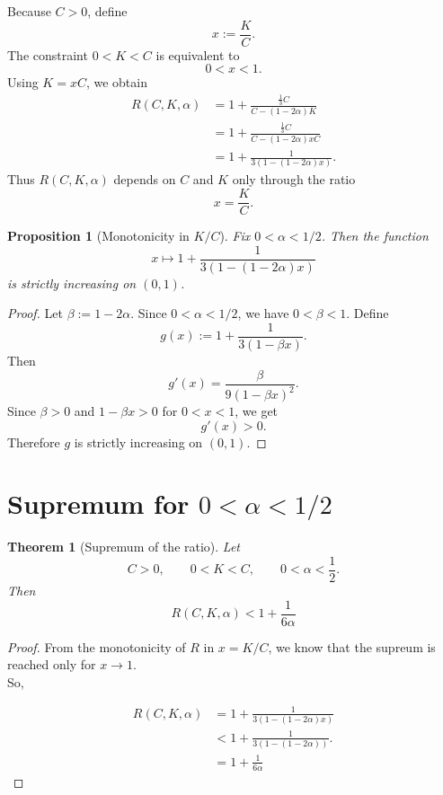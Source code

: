 \documentclass[11pt]{article}
\newtheorem{theorem}{Theorem}
\newtheorem{proposition}{Proposition}
\begin{document}
Because $C>0$, define
\[
    x:=\frac{K}{C}.
\]
The constraint $0<K<C$ is equivalent to
\[
    0<x<1.
\]
Using $K=xC$, we obtain
\begin{align*}
    R(C,K,\alpha)
    &=
    1+
    \frac{\frac13 C}{C-(1-2\alpha) K} \\
    &=
    1+
    \frac{\frac13 C}{C-(1-2\alpha)xC} \\
    &=
    1+
    \frac{1}{3(1-(1-2\alpha) x)}.
\end{align*}
Thus $R(C,K,\alpha)$ depends on $C$ and $K$ only through the ratio
\[
    x=\frac KC.
\]

\begin{proposition}[Monotonicity in $K/C$]
Fix $0<\alpha<1/2$. Then the function
\[
    x\mapsto 1+\frac{1}{3(1-(1-2\alpha)x)}
\]
is strictly increasing on $(0,1)$.
\end{proposition}

\begin{proof}
Let $\beta := 1-2\alpha$. Since $0<\alpha<1/2$, we have $0<\beta<1$. Define
\[
    g(x):=1+\frac{1}{3(1-\beta x)}.
\]
Then
\[
    g'(x)
    =
    \frac{\beta}{9(1-\beta x)^2}.
\]
Since $\beta>0$ and $1-\beta x>0$ for $0<x<1$, we get
\[
    g'(x)>0.
\]
Therefore $g$ is strictly increasing on $(0,1)$.
\end{proof}

\section{Supremum for $0<\alpha<1/2$}

\begin{theorem}[Supremum of the ratio]
Let
\[
    C>0, \qquad 0<K<C, \qquad 0<\alpha<\frac12.
\]
Then
\[
    R(C,K,\alpha)<1+\frac{1}{6\alpha}
\]
\end{theorem}

\begin{proof}
From the monotonicity of $R$ in $x=K/C$, we know that the supreum is reached only for $x \rightarrow 1$. \\
So, 

\begin{align*}
    R(C,K,\alpha)
    &=
    1+
    \frac{1}{3(1-(1-2\alpha)x)}\\
    &<
    1+
    \frac{1}{3(1-(1-2\alpha))}.\\
    &=
    1+\frac{1}{6\alpha}
\end{align*}

\end{proof}
\end{document}
